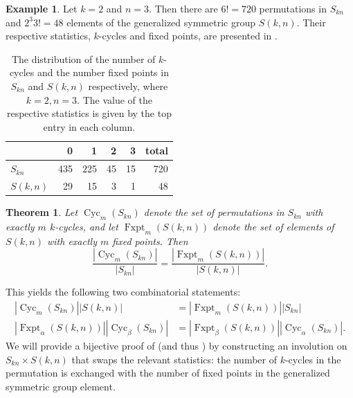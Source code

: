 \documentclass{article}
\newtheorem{theorem}{Theorem}[section]
\numberwithin{theorem}{section}
\theoremstyle{definition}
\newtheorem{example}{Example}
\newcommand{\Cyc}{\operatorname{Cyc}}
\newcommand{\Fxpt}{\operatorname{Fxpt}}
\begin{document}
\begin{example}
    Let $k=2$ and $n=3$. Then there are $6! = 720$ permutations in $S_{kn}$ and $2^3 3! = 48$ elements of the generalized symmetric group $S(k,n)$. Their respective statistics, $k$-cycles and fixed points, are presented in .
\begin{table}[h!]
    \centering
    \begin{tabular}{|l|r|r|r|r|r|}
      \hline
       & 0 & 1 & 2 & 3 & total \\
      \hline
      $S_{kn}$ & 435 & 225 & 45 & 15 & 720\\
      \hline
      $S(k,n)$ & 29 & 15 & 3 & 1 & 48\\
      \hline
    \end{tabular}
    \caption{The distribution of the number of $k$-cycles and the number fixed points in $S_{kn}$ and $S(k,n)$ respectively, where $k=2,n=3$. The value of the respective statistics is given by the top entry in each column.}
    \label{table:statistic}
\end{table}
\end{example}

\begin{theorem}
Let $\Cyc_m(S_{kn})$ denote the set of permutations in $S_{kn}$ with exactly $m$ $k$-cycles, and let $\Fxpt_m(S(k,n))$ denote the set of elements of $S(k,n)$ with exactly $m$ fixed points. Then \[
    \frac{
        \left|\Cyc_m(S_{kn})\right|
    }{
        \left|S_{kn}\right|
    } =
    \frac{
        \left|\Fxpt_m\!\left(S(k,n)\right)\right|
    }{
        \left|S(k,n)\right|
    }.
\]
\label{eq:mainTheorem}
\end{theorem}
This yields the following two combinatorial statements:
\begin{align}
    \left|\Cyc_m(S_{kn})\right|\left|S(k,n)\right|
    &=
    \left|\Fxpt_m\!\left(S(k,n)\right)\right|
    \left|S_{kn}\right|
    \\
    \left|\Fxpt_\alpha\!\left(S(k,n)\right)\right|
    \left|\Cyc_\beta(S_{kn})\right|
    &=
    \left|\Fxpt_\beta\!\left(S(k,n)\right)\right|
    \left|\Cyc_\alpha(S_{kn})\right|.
    \label{eq:combinatorialEquation}
\end{align}
We will provide a bijective proof of  (and thus ) by constructing an involution on $S_{kn} \times S(k,n)$ that swaps the relevant statistics: the number of $k$-cycles in the permutation is exchanged with the number of fixed points in the generalized symmetric group element.
\end{document}
